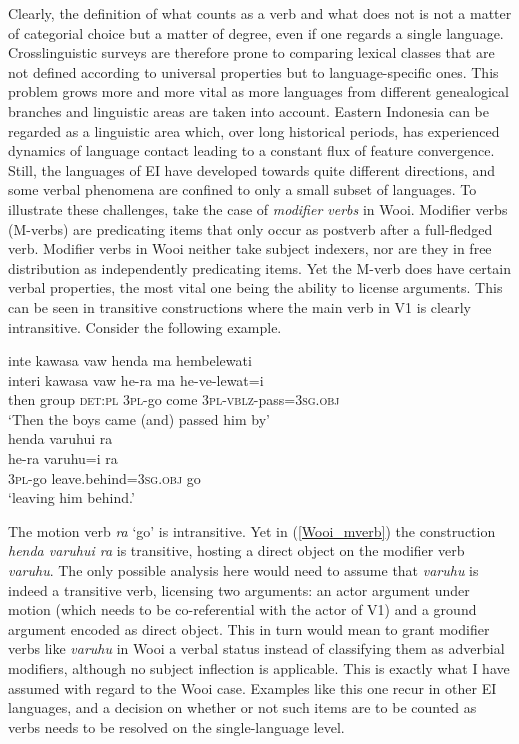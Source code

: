 Clearly, the definition of what counts as a verb and what does not is not a matter of categorial choice but a matter of degree, even if one regards a single language. Crosslinguistic surveys are therefore prone to comparing lexical classes that are not defined according to universal properties but to language-specific ones. This problem grows more and more vital as more languages from different genealogical branches and linguistic areas are taken into account. Eastern Indonesia can be regarded as a linguistic area which, over long historical periods, has experienced dynamics of language contact leading to a constant flux of feature convergence. Still, the languages of EI have developed towards quite different directions, and some verbal phenomena are confined to only a small subset of languages. To illustrate these challenges, take the case of \textit{modifier verbs} in Wooi. Modifier verbs (M-verbs) are predicating items that only occur as postverb after a full-fledged verb. Modifier verbs in Wooi neither take subject indexers, nor are they in free distribution as independently predicating items. Yet the M-verb does have certain verbal properties, the most vital one being the ability to license arguments. This can be seen in transitive constructions where the main verb in V1 is clearly intransitive. Consider the following example.

\ea 
{}
\ea
\glll inte kawasa vaw henda ma hembelewati \\
interi kawasa vaw he-ra ma he-ve-lewat=i \\
then group \textsc{det}:\textsc{pl} \textsc{3}\textsc{pl}-go come \textsc{3}\textsc{pl}-\textsc{vblz}-pass=\textsc{3}\textsc{sg}.\textsc{obj} \\
\glft `Then the boys came (and) passed him by' \\ 
\ex \label{Wooi_mverb}
\glll henda varuhui ra \\ 
he-ra varuhu=i ra \\
\textsc{3}\textsc{pl}-go leave.behind=\textsc{3}\textsc{sg}.\textsc{obj} go \\
\glft `leaving him behind.'\\ 
\z
\z

The motion verb \textit{ra} `go' is intransitive. Yet in (\ref{Wooi_mverb}) the construction \textit{henda varuhui ra} is transitive, hosting a direct object on the modifier verb \textit{varuhu}. The only possible analysis here would need to assume that \textit{varuhu} is indeed a transitive verb, licensing two arguments: an actor argument under motion (which needs to be co-referential with the actor of V1) and a ground argument encoded as direct object. This in turn would mean to grant modifier verbs like \textit{varuhu} in Wooi a verbal status instead of classifying them as adverbial modifiers, although no subject inflection is applicable. This is exactly what I have assumed with regard to the Wooi case. Examples like this one recur in other EI languages, and a decision on whether or not such items are to be counted as verbs needs to be resolved on the single-language level.

